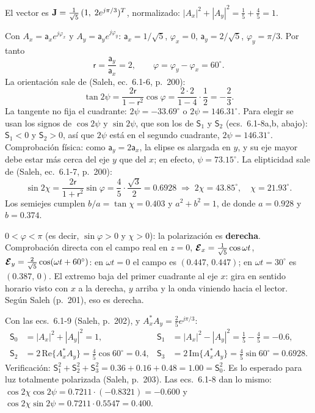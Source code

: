 \label{sol:18}

El vector es $\mathbf J=\frac{1}{\sqrt5}\,(1,\;2e^{j\pi/3})^T$, normalizado: $|A_x|^2+|A_y|^2=\frac{1}{5}+\frac45=1$.

 Con $A_x=\mathsf a_xe^{j\varphi_x}$ y $A_y=\mathsf a_ye^{j\varphi_y}$:
$\mathsf a_x=1/\sqrt5$, $\varphi_x=0$, $\mathsf a_y=2/\sqrt5$, $\varphi_y=\pi/3$. Por tanto
\[
\mathsf r=\frac{\mathsf a_y}{\mathsf a_x}=2,\qquad \varphi=\varphi_y-\varphi_x=60^\circ .
\]
La orientación sale de (Saleh, ec.~6.1-6, p.~200):
\[
\tan2\psi=\frac{2\mathsf r}{1-\mathsf r^2}\cos\varphi=\frac{2\cdot2}{1-4}\cdot\frac12=-\frac23 .
\]
La tangente no fija el cuadrante: $2\psi=-33.69^\circ$ o $2\psi=146.31^\circ$. Para elegir se usan
los signos de $\cos2\psi$ y $\sin2\psi$, que son los de $\mathsf S_1$ y $\mathsf S_2$ (ecs.~6.1-8a,b, abajo):
$\mathsf S_1<0$ y $\mathsf S_2>0$, así que $2\psi$ está en el segundo cuadrante, $2\psi=146.31^\circ$.
Comprobación física: como $\mathsf a_y=2\mathsf a_x$, la elipse es alargada en $y$, y su eje mayor
debe estar más cerca del eje $y$ que del $x$; en efecto, $\psi=73.15^\circ$.
La elipticidad sale de (Saleh, ec.~6.1-7, p.~200):
\[
\sin2\chi=\frac{2\mathsf r}{1+\mathsf r^2}\sin\varphi=\frac{4}{5}\cdot\frac{\sqrt3}{2}=0.6928
\;\Rightarrow\;2\chi=43.85^\circ,\quad \chi=21.93^\circ .
\]
Los semiejes cumplen $b/a=\tan\chi=0.403$ y $a^2+b^2=1$, de donde $a=0.928$ y $b=0.374$.

 $0<\varphi<\pi$ (es decir, $\sin\varphi>0$ y $\chi>0$): la polarización es \textbf{derecha}.
Comprobación directa con el campo real en $z=0$, $\boldsymbol{\mathcal E}_x=\frac{1}{\sqrt5}\cos\omega t$,
$\boldsymbol{\mathcal E}_y=\frac{2}{\sqrt5}\cos(\omega t+60^\circ)$: en $\omega t=0$ el campo es
$(0.447,\,0.447)$; en $\omega t=30^\circ$ es $(0.387,\,0)$. El extremo baja del primer cuadrante al eje
$x$: gira en sentido horario visto con $x$ a la derecha, $y$ arriba y la onda viniendo hacia el lector.
Según Saleh (p.~201), eso es derecha.

 Con las ecs.~6.1-9 (Saleh, p.~202), y $A_x^*A_y=\frac{2}{5}e^{j\pi/3}$:
\begin{align*}
\mathsf S_0&=|A_x|^2+|A_y|^2=1, &
\mathsf S_1&=|A_x|^2-|A_y|^2=\tfrac15-\tfrac45=-0.6,\\
\mathsf S_2&=2\,\mathrm{Re}\{A_x^*A_y\}=\tfrac45\cos60^\circ=0.4, &
\mathsf S_3&=2\,\mathrm{Im}\{A_x^*A_y\}=\tfrac45\sin60^\circ=0.6928 .
\end{align*}
Verificación: $\mathsf S_1^2+\mathsf S_2^2+\mathsf S_3^2=0.36+0.16+0.48=1.00=\mathsf S_0^2$. Es lo esperado para
luz totalmente polarizada (Saleh, p.~203).
Las ecs.~6.1-8 dan lo mismo: $\cos2\chi\cos2\psi=0.7211\cdot(-0.8321)=-0.600$ y
$\cos2\chi\sin2\psi=0.7211\cdot0.5547=0.400$.

